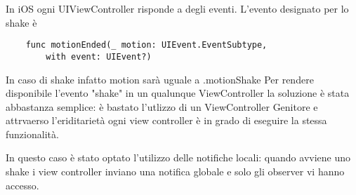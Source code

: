 In iOS ogni UIViewController risponde a degli eventi. L'evento designato per lo shake è
\begin{verbatim}
    func motionEnded(_ motion: UIEvent.EventSubtype,
        with event: UIEvent?)
\end{verbatim}

In caso di shake infatto motion sarà uguale a .motionShake
Per rendere disponibile l'evento "shake" in un qualunque ViewController la soluzione è stata abbastanza semplice:
è bastato l'utlizzo di un ViewController Genitore e attrvaerso l'eriditarietà ogni view controller è in grado
di eseguire la stessa funzionalità.

In questo caso è stato optato l'utilizzo delle notifiche locali: quando avviene uno shake i view controller inviano una notifica 
globale e solo gli observer vi hanno accesso.
